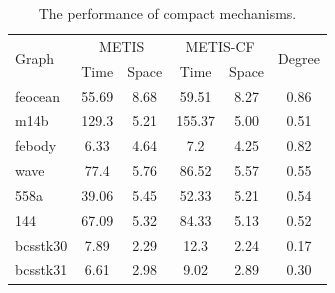 \documentclass[12pt,glossary]{dalthesis}
\begin{document}
\begin{table}[h]
\centering
\caption{The performance of compact mechanisms.}
\label{compact-performance}
\begin{tabular}{|l||c|c||c|c||c|}
\cline{2-6}
\hline
\multirow{2}{*}{Graph} & \multicolumn{2}{c||}{METIS} & \multicolumn{2}{c||}{METIS-CF} & \multirow{2}{*}{Degree} \\ \cline{2-5}
                       & Time          & Space        & Time           & Space         &                         \\ \cline{6-6} \hline
feocean                & 55.69         & 8.68         & 59.51          & 8.27          & 0.86                    \\
m14b                   & 129.3         & 5.21         & 155.37         & 5.00          & 0.51                    \\
febody                 & 6.33          & 4.64         & 7.2            & 4.25          & 0.82                    \\
wave                   & 77.4          & 5.76         & 86.52          & 5.57          & 0.55                    \\
558a                   & 39.06         & 5.45         & 52.33          & 5.21          & 0.54                    \\
144                    & 67.09         & 5.32         & 84.33          & 5.13          & 0.52                    \\
bcsstk30               & 7.89          & 2.29         & 12.3           & 2.24          & 0.17                    \\
bcsstk31               & 6.61          & 2.98         & 9.02           & 2.89          & 0.30                    \\ \hline
\end{tabular}
\end{table}
\end{document}
